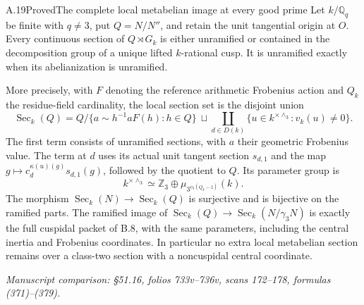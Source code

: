 \begin{statement}{A.19}{Proved}{The complete local metabelian image at every good prime}
Let $k/\mathbb Q_q$ be finite with $q\ne3$, put
$Q=N/N''$, and retain the unit tangential origin at $O$.
Every continuous section of $Q\rtimes G_k$ is either
unramified or contained in the decomposition group of a
unique lifted $k$-rational cusp. It is unramified exactly
when its abelianization is unramified.

More precisely, with $F$ denoting the reference arithmetic
Frobenius action and $Q_k$ the residue-field cardinality,
the local section set is the disjoint union
\[
 \operatorname{Sec}_k(Q)=
 Q/\{a\sim h^{-1}aF(h):h\in Q\}
 \ \sqcup\!
 \coprod_{d\in D(k)}
 \{u\in k^{\times\wedge_3}:v_k(u)\ne0\}.
 \tag{A.19.1}
\]
The first term consists of unramified sections, with $a$
their geometric Frobenius value. The term at $d$ uses its
actual unit tangent section $s_{d,1}$ and the map
$g\mapsto c_d^{\kappa(u)(g)}s_{d,1}(g)$, followed by
the quotient to $Q$. Its parameter group is
\[
 k^{\times\wedge_3}
      \simeq\mathbb Z_3\oplus
                 \mu_{3^{v_3(Q_k-1)}}(k).
\]
The morphism
$\operatorname{Sec}_k(N)\to\operatorname{Sec}_k(Q)$
is surjective and is bijective on the ramified parts.
The ramified image of
$\operatorname{Sec}_k(Q)\to
\operatorname{Sec}_k(N/\gamma_3N)$
is exactly the full cuspidal packet of B.8, with the same
parameters, including the central inertia and Frobenius
coordinates. In particular no extra local metabelian
section remains over a class-two section with a noncuspidal
central coordinate.
\par\smallskip\noindent\emph{Manuscript comparison: \S51.16,
folios 733v--736v, scans 172--178, formulas (371)--(379).}
\end{statement}
